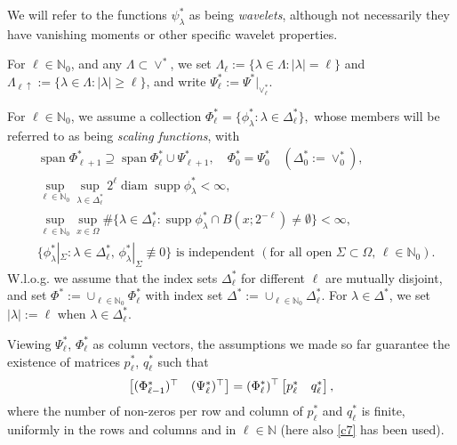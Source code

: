 \documentclass{amsart}
\theoremstyle{definition}
\theoremstyle{remark}
\numberwithin{equation}{section}
\newcommand{\N}{\mathbb N}
\DeclareMathOperator{\supp}{supp}
\DeclareMathOperator{\diam}{diam}
\DeclareMathOperator{\Span}{span}
\newcommand{\1}{\mathbb 1}
\begin{document}
We will refer to the functions $\psi^*_\lambda$ as being {\em wavelets}, although not necessarily they have vanishing moments or other specific wavelet properties.

For $\ell \in \N_0$, and any $\Lambda \subset \vee^*$, we set $\Lambda_\ell:=\{\lambda \in \Lambda:|\lambda|=\ell\}$ and 
$\Lambda_{\ell\uparrow}:=\{\lambda \in \Lambda:|\lambda| \geq \ell\}$, and write $\Psi^*_\ell:=\Psi^*|_{\vee^*_\ell}$.

For $\ell \in \N_0$, we assume a collection
$
\Phi^*_\ell=\{\phi^*_\lambda\colon \lambda \in \Delta^*_\ell\},
$
whose members will be referred to as being {\em scaling functions},
with
\begin{align} \label{c4}
& \Span \Phi^*_{\ell+1} \supseteq  \Span \Phi^*_{\ell} \cup \Psi^*_{\ell+1},\quad \Phi^*_0=\Psi^*_0 \quad(\Delta_0^*:=\vee_0^*), \\
\label{c5}
& \sup_{\ell \in \N_0}\sup_{\lambda \in \Delta^*_\ell} 2^{\ell} \diam \supp \phi^*_\lambda <\infty, \\
\label{c6}
& \sup_{\ell \in \N_0} \sup_{x \in \Omega} \#\{\lambda \in \Delta^*_\ell: \supp \phi^*_\lambda \cap B(x;2^{-\ell}) \neq \emptyset\} <\infty,\\
\label{c7}
& \{\phi^*_\lambda|_\Sigma: \lambda \in \Delta^*_\ell,\,\phi^*_\lambda|_\Sigma \not\equiv 0\} \text{ is independent } (\text{for all open } \Sigma \subset \Omega,\,\ell \in \N_0).
\end{align}
W.l.o.g. we assume that the index sets $\Delta^*_\ell$ for different $\ell$ are mutually disjoint, and set $\Phi^*:=\cup_{\ell \in \N_0} \Phi^*_\ell$ with index set $\Delta^*:=\cup_{\ell \in \N_0} \Delta^*_\ell$. For $\lambda \in \Delta^*$, we set $|\lambda|:=\ell$ when $\lambda \in \Delta^*_\ell$.

Viewing $\Psi^*_\ell$, $\Phi^*_\ell$ as column vectors, the assumptions we made so far guarantee the existence of matrices $p^*_{\ell}$, $q^*_{\ell}$ such that
$$
\left[\begin{array}{@{}cc@{}} (\Phi^*_{\ell-1})^\top & (\Psi^*_\ell)^\top \end{array} \right] = (\Phi^*_{\ell})^\top
\left[\begin{array}{@{}cc@{}} p^*_{\ell} & q^*_{\ell} \end{array} \right],
$$
where the number of non-zeros per row and column of $p^*_{\ell}$ and $q^*_{\ell}$ is finite, uniformly in the rows and columns and in $\ell \in \N$ (here also \eqref{c7} has been used).
\end{document}

